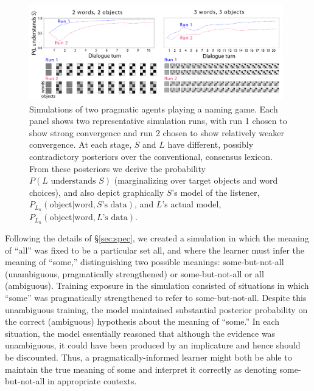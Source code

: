 \documentclass{article} %
\newcommand{\word}{\text{word}}
\newcommand{\obj}{\text{object}}
\begin{document}
\begin{figure}[t]
\centering
\includegraphics[width=0.98\textwidth]{figures/emergence-composite.pdf}
\caption{\label{fig:emergence} Simulations of two pragmatic agents
  playing a naming game. Each panel shows two representative
  simulation runs, with run 1 chosen to show strong convergence and
  run 2 chosen to show relatively weaker convergence. At each stage,
  $S$ and $L$ have different, possibly contradictory posteriors over
  the conventional, consensus lexicon. From these posteriors we derive
  the probability $P(\text{$L$ understands $S$})$ (marginalizing over
  target objects and word choices), and also depict graphically $S$'s
  model of the listener, $P_{L_n}(\obj | \word, \text{$S$'s data})$,
  and $L$'s actual model, $P_{L_n}(\obj | \word, \text{$L$'s
    data})$. }
\end{figure}

Following the details of \S\ref{sec:spec}, we created a simulation in
which the meaning of ``all'' was fixed to be a particular set {\sc
  all}, and where the learner must infer the meaning of ``some,''
distinguishing two possible meanings: {\sc some-but-not-all}
(unambiguous, 
pragmatically strengthened) or
{\sc some-but-not-all or all} (ambiguous). Training exposure in the
simulation consisted of situations in which ``some'' was pragmatically
strengthened to refer to {\sc some-but-not-all}. Despite this
unambiguous training, the model maintained substantial
posterior probability on the correct (ambiguous) hypothesis about the
meaning of ``some.'' In each
situation, the model essentially reasoned that although the evidence
was unambiguous, it could have been produced by an implicature and
hence should be discounted. Thus, a pragmatically-informed learner
might both be able to maintain the true meaning of {\sc some} and
interpret it correctly as denoting {\sc some-but-not-all} in
appropriate contexts. 
\end{document}
